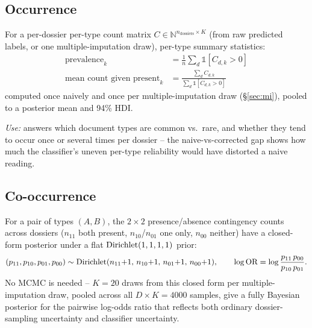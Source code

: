 \subsection{Occurrence}
\label{sec:occurrence}

For a per-dossier per-type count matrix $C \in \mathbb{N}^{n_{\text{dossiers}}
\times K}$ (from raw predicted labels, or one multiple-imputation draw),
per-type summary statistics:
\begin{align}
  \text{prevalence}_k &= \tfrac{1}{n}\textstyle\sum_d \mathbb{1}[C_{d,k}>0] \\
  \text{mean count given present}_k &=
    \frac{\sum_d C_{d,k}}{\sum_d \mathbb{1}[C_{d,k}>0]}
\end{align}
computed once naively and once per multiple-imputation draw (\S\ref{sec:mi}),
pooled to a posterior mean and 94\% HDI.

\textit{Use:} answers which document types are common vs.\ rare, and whether
they tend to occur once or several times per dossier -- the naive-vs-corrected
gap shows how much the classifier's uneven per-type reliability would have
distorted a naive reading.

\subsection{Co-occurrence}
\label{sec:cooccurrence}

For a pair of types $(A,B)$, the $2\times2$ presence/absence contingency
counts across dossiers ($n_{11}$ both present, $n_{10}$/$n_{01}$ one only,
$n_{00}$ neither) have a closed-form posterior under a flat
$\mathrm{Dirichlet}(1,1,1,1)$ prior:
\begin{equation}
  (p_{11}, p_{10}, p_{01}, p_{00}) \sim
    \mathrm{Dirichlet}(n_{11}{+}1,\, n_{10}{+}1,\, n_{01}{+}1,\, n_{00}{+}1),
  \qquad
  \log\text{OR} = \log\frac{p_{11}\, p_{00}}{p_{10}\, p_{01}}.
\end{equation}
No MCMC is needed -- $K=20$ draws from this closed form per multiple-imputation
draw, pooled across all $D \times K = 4000$ samples, give a fully Bayesian
posterior for the pairwise log-odds ratio that reflects both ordinary
dossier-sampling uncertainty and classifier uncertainty.

